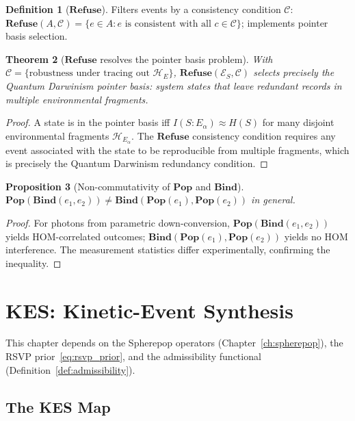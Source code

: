 \documentclass[11pt, openright, twoside]{book}
\theoremstyle{plain}
\newtheorem{theorem}{Theorem}[chapter]
\newtheorem{proposition}[theorem]{Proposition}
\theoremstyle{definition}
\newtheorem{definition}[theorem]{Definition}
\theoremstyle{remark}
\newcommand{\Pop}{\mathbf{Pop}}
\newcommand{\Bind}{\mathbf{Bind}}
\newcommand{\Refuse}{\mathbf{Refuse}}
\begin{document}
\begin{definition}[$\Refuse$] Filters events by a consistency condition $\mathcal{C}$:
$\Refuse(A,\mathcal{C})=\{e\in A:e\text{ is consistent with all }c\in\mathcal{C}\}$;
implements pointer basis selection.\end{definition}

\begin{theorem}[$\Refuse$ resolves the pointer basis problem]
\label{thm:refuse_pointer}
With $\mathcal{C}=\{\text{robustness under tracing out }\mathcal{H}_E\}$,
$\Refuse(\mathcal{E}_S,\mathcal{C})$ selects precisely the Quantum Darwinism pointer basis:
system states that leave redundant records in multiple environmental fragments.
\end{theorem}

\begin{proof}
A state is in the pointer basis iff $I(S:E_\alpha)\approx H(S)$ for many disjoint
environmental fragments $\mathcal{H}_{E_\alpha}$. The $\Refuse$ consistency condition
requires any event associated with the state to be reproducible from multiple fragments,
which is precisely the Quantum Darwinism redundancy condition.
\end{proof}

\begin{proposition}[Non-commutativity of $\Pop$ and $\Bind$]
$\Pop(\Bind(e_1,e_2))\neq\Bind(\Pop(e_1),\Pop(e_2))$ in general.
\end{proposition}

\begin{proof}
For photons from parametric down-conversion, $\Pop(\Bind(e_1,e_2))$ yields HOM-correlated
outcomes; $\Bind(\Pop(e_1),\Pop(e_2))$ yields no HOM interference. The measurement statistics
differ experimentally, confirming the inequality.
\end{proof}

\chapter{KES: Kinetic-Event Synthesis}
\label{ch:kes}

\begin{depbox}
This chapter depends on the Spherepop operators (Chapter~\ref{ch:spherepop}), the RSVP
prior~\eqref{eq:rsvp_prior}, and the admissibility functional (Definition~\ref{def:admissibility}).
\end{depbox}

\section{The KES Map}
\end{document}
